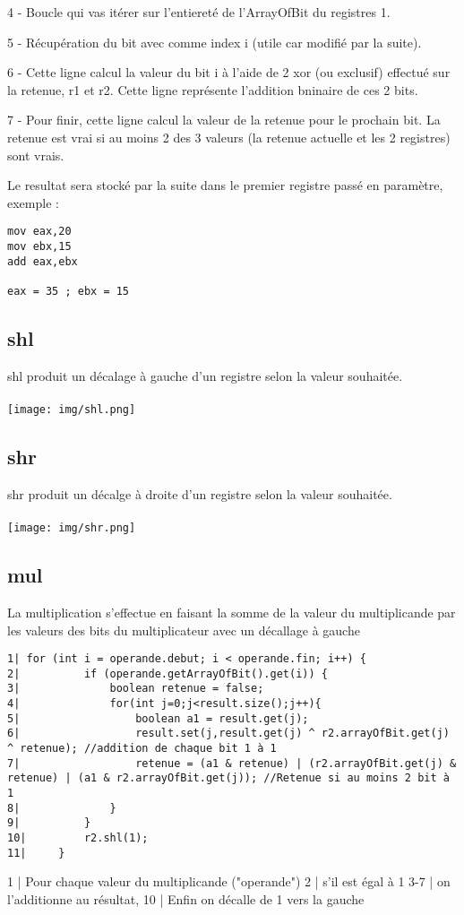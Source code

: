 \documentclass{article}
\begin{document}
4 - Boucle qui vas itérer sur l'entiereté de l'ArrayOfBit du registres 1.

5 - Récupération du bit avec comme index i (utile car modifié par la suite).

6 - Cette ligne calcul la valeur du bit i à l'aide de 2 xor (ou exclusif) effectué sur la retenue, r1 et r2. Cette ligne représente l'addition bninaire de ces 2 bits.

7 - Pour finir, cette ligne calcul la valeur de la retenue pour le prochain bit. La retenue est vrai si au moins 2 des 3 valeurs (la retenue actuelle et les 2 registres) sont vrais.

Le resultat sera stocké par la suite dans le premier registre passé en paramètre, exemple :
\begin{verbatim}
mov eax,20
mov ebx,15
add eax,ebx

eax = 35 ; ebx = 15
\end{verbatim}

\newpage
\subsection{shl}
shl produit un décalage à gauche d'un registre selon la valeur souhaitée.
\\
\\
\texttt{[image: img/shl.png]}

\subsection{shr}
shr produit un décalge à droite d'un registre selon la valeur souhaitée.
\\
\\
\texttt{[image: img/shr.png]}
\newpage
\subsection{mul}
La multiplication s'effectue en faisant la somme de la valeur du multiplicande par les valeurs des bits du multiplicateur avec un décallage à gauche
\begin{verbatim}
1| for (int i = operande.debut; i < operande.fin; i++) {
2|          if (operande.getArrayOfBit().get(i)) {
3|              boolean retenue = false;
4|              for(int j=0;j<result.size();j++){
5|                  boolean a1 = result.get(j);
6|                  result.set(j,result.get(j) ^ r2.arrayOfBit.get(j) ^ retenue); //addition de chaque bit 1 à 1
7|                  retenue = (a1 & retenue) | (r2.arrayOfBit.get(j) & retenue) | (a1 & r2.arrayOfBit.get(j)); //Retenue si au moins 2 bit à 1
8|              }
9|          }
10|         r2.shl(1);
11|     }
\end{verbatim}
1 | Pour chaque valeur du multiplicande ("operande")
2 | s'il est égal à 1
3-7 | on l'additionne au résultat,
10 | Enfin on décalle de 1 vers la gauche
\end{document}
